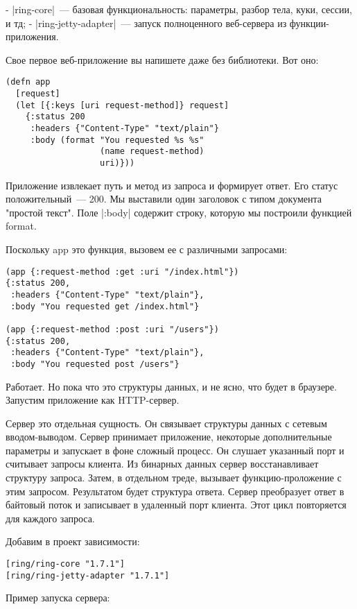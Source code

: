 - \spverb|ring-core|~--- базовая функциональность: параметры, разбор тела, куки, сессии,
  и тд;
- \spverb|ring-jetty-adapter|~--- запуск полноценного веб-сервера из функции-приложения.

Свое первое веб-приложение вы напишете даже без библиотеки. Вот оно:

\begin{verbatim}
(defn app
  [request]
  (let [{:keys [uri request-method]} request]
    {:status 200
     :headers {"Content-Type" "text/plain"}
     :body (format "You requested %s %s"
                   (name request-method)
                   uri)}))
\end{verbatim}

Приложение извлекает путь и метод из запроса и формирует ответ. Его статус
положительный~--- 200. Мы выставили один заголовок с типом документа "простой
текст". Поле \spverb|:body| содержит строку, которую мы построили функцией format.

Поскольку app это функция, вызовем ее с различными запросами:

\begin{verbatim}
(app {:request-method :get :uri "/index.html"})
{:status 200,
 :headers {"Content-Type" "text/plain"},
 :body "You requested get /index.html"}

(app {:request-method :post :uri "/users"})
{:status 200,
 :headers {"Content-Type" "text/plain"},
 :body "You requested post /users"}
\end{verbatim}

Работает. Но пока что это структуры данных, и не ясно, что будет в
браузере. Запустим приложение как HTTP-сервер.

Сервер это отдельная сущность. Он связывает структуры данных с сетевым
вводом-выводом. Сервер принимает приложение, некоторые дополнительные параметры
и запускает в фоне сложный процесс. Он слушает указанный порт и считывает
запросы клиента. Из бинарных данных сервер восстанавливает структуру
запроса. Затем, в отдельном треде, вызывает функцию-проложение с этим
запросом. Результатом будет структура ответа. Сервер преобразует ответ в
байтовый поток и записывает в удаленный порт клиента. Этот цикл повторяется для
каждого запроса.

Добавим в проект зависимости:

\begin{verbatim}
[ring/ring-core "1.7.1"]
[ring/ring-jetty-adapter "1.7.1"]
\end{verbatim}

Пример запуска сервера:

